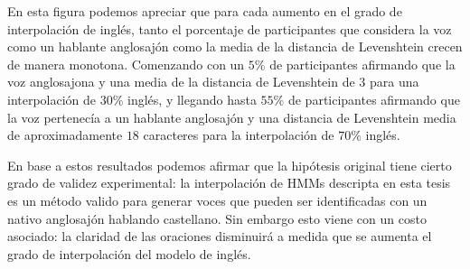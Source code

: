 En esta figura podemos apreciar que para cada aumento en el grado de interpolación de inglés, tanto el porcentaje de participantes que considera la voz como un hablante anglosajón como la media de la distancia de Levenshtein crecen de manera monotona. Comenzando con un $5\%$ de participantes afirmando que la voz anglosajona y una media de la distancia de Levenshtein de $3$ para una interpolación de $30\%$ inglés, y llegando hasta $55\%$ de participantes afirmando que la voz pertenecía a un hablante anglosajón y una distancia de Levenshtein media de aproximadamente $18$ caracteres para la interpolación de $70\%$ inglés.

En base a estos resultados podemos afirmar que la hipótesis original tiene cierto grado de validez experimental: la interpolación de HMMs descripta en esta tesis es un método valido para generar voces que pueden ser identificadas con un nativo anglosajón hablando castellano. Sin embargo esto viene con un costo asociado: la claridad de las oraciones disminuirá a medida que se aumenta el grado de interpolación del modelo de inglés.

\unificarGradoInglesGradoCastellanoAGradoIngles